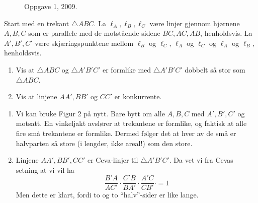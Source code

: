 \documentclass[11pt, norsk]{article}
\begin{document}
\begin{losn}
\begin{figure}
\begin{center}
    \caption{Oppgave 1, 2009.}    
\end{center}
  \end{figure}
\end{losn}

\begin{oppg}
Start med en trekant $\triangle ABC$. La $\ell_A,\ell_B,\ell_C$ være linjer gjennom hjørnene $A,B,C$ som er parallele med de motstående sidene $BC,AC,AB$, henholdsvis. La $A',B',C'$ være skjæringspunktene mellom $\ell_B$ og $\ell_C$, $\ell_A$ og $\ell_C$ og $\ell_A$ og $\ell_B$, henholdsvis.
\begin{enumerate}

\item Vis at $\triangle ABC$ og $\triangle A'B'C'$ er formlike med $\triangle A'B'C'$ dobbelt så stor som $\triangle ABC$.

\item Vis at linjene $AA',BB'$ og $CC'$ er konkurrente.
\end{enumerate}
\end{oppg}

\begin{losn}
  \begin{enumerate}
  \item Vi kan bruke Figur 2 på nytt. Bare bytt om alle $A,B,C$ med $A',B',C'$ og motsatt. En vinkeljakt avslører at trekantene er formlike, og faktisk at alle fire små trekantene er formlike. Dermed følger det at hver av de små er halvparten så store (i lengder, ikke areal!) som den store.
\item Linjene $AA',BB',CC'$ er Ceva-linjer til $\triangle A'B'C'$. Da vet vi fra Cevas setning at vi vil ha
$$
\frac{B'A}{AC'} \cdot
\frac{C'B}{BA'} \cdot
\frac{A'C}{CB'} \cdot = 1
$$
Men dette er klart, fordi to og to ``halv''-sider er like lange. 
  \end{enumerate}
\end{losn}
\end{document}
